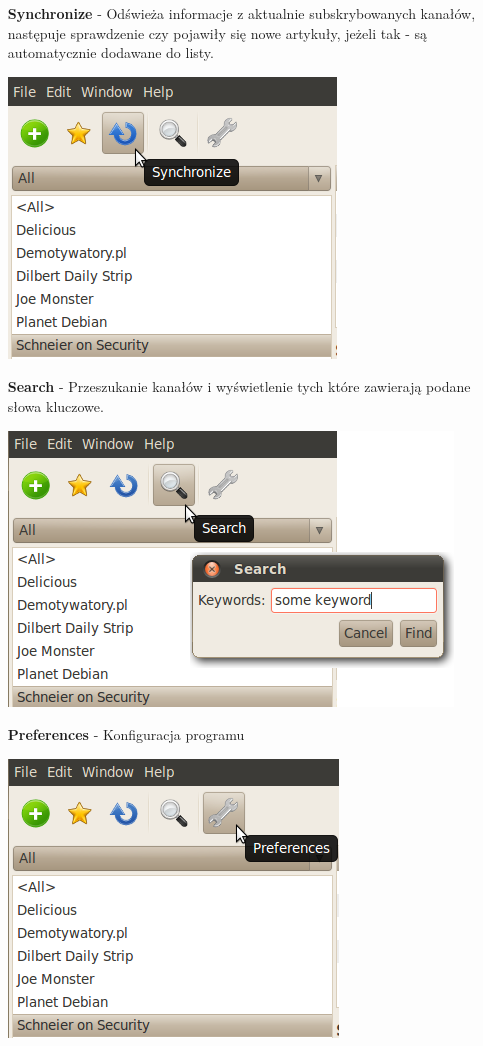 \documentclass[a4paper,11pt]{report}
\begin{document}
\begin{itemize}
	\newpage
	\item[\textbf{Synchronize}] - Odświeża informacje z aktualnie 
		subskrybowanych kanałów, następuje sprawdzenie czy pojawiły się
		nowe artykuły, jeżeli tak - są automatycznie dodawane do listy.
	\begin{center}
		\includegraphics[scale=0.5]{./img/menu_sync.png}
	\end{center}

	\newpage
	\item[\textbf{Search}] - Przeszukanie kanałów i wyświetlenie tych które 
		zawierają podane słowa kluczowe.
	\begin{center}
		\includegraphics[scale=0.5]{./img/menu_search.png}
	\end{center}

	\newpage
	\item[\textbf{Preferences}] - Konfiguracja programu
	\begin{center}
		\includegraphics[scale=0.5]{./img/menu_pref.png}
	\end{center}
\end{itemize}
\end{document}
